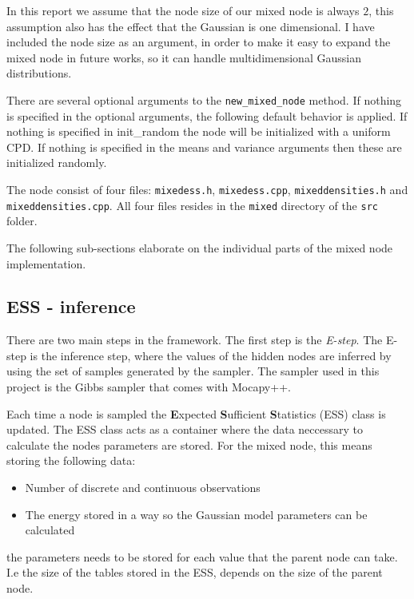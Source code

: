 \documentclass[10pt, journal, compsoc, a4paper]{IEEEtran}
\begin{document}
In this report we assume that the node size of our mixed node is always $2$, this assumption also has the effect that the Gaussian is one dimensional. I have included the node size as an argument, in order to make it easy to expand the mixed node in future works, so it can handle multidimensional Gaussian distributions. 

There are several optional arguments to the \texttt{new\_mixed\_node} method. If nothing is specified in the optional arguments, the following default behavior is applied. If nothing is specified in init\_random the node will be initialized with a uniform CPD. If nothing is specified in the means and variance arguments then these are initialized randomly.

The node consist of four files: \texttt{mixedess.h}, \texttt{mixedess.cpp}, \texttt{mixeddensities.h} and \texttt{mixeddensities.cpp}. All four files resides in the \texttt{mixed} directory of the \texttt{src} folder.

The following sub-sections elaborate on the individual parts of the mixed node implementation.


\subsection{ESS - inference} %
\label{sub:ess}
There are two main steps in the framework. The first step is the \emph{E-step}. The E-step is the inference step, where the values of the hidden nodes are inferred by using the set of samples generated by the sampler. The sampler used in this project is the Gibbs sampler that comes with Mocapy++.

Each time a node is sampled the \textbf{E}xpected \textbf{S}ufficient \textbf{S}tatistics (ESS) class is updated. The ESS class acts as a container where the data neccessary to calculate the nodes parameters are stored. For the mixed node, this means storing the following data:

\begin{itemize}
  \item Number of discrete and continuous observations
  \item The energy stored in a way so the Gaussian model parameters can be calculated
\end{itemize}
the parameters needs to be stored for each value that the parent node can take. I.e the size of the tables stored in the ESS, depends on the size of the parent node.
\end{document}
